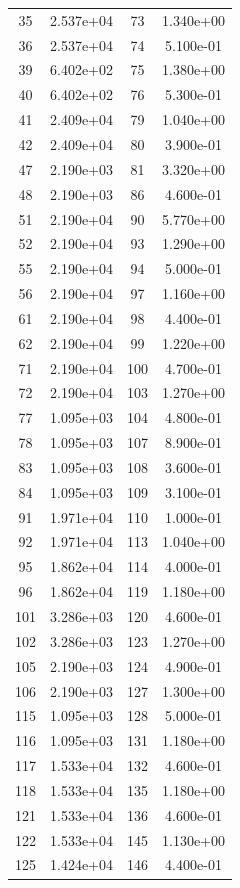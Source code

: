 \documentclass[12pt]{article}
\begin{document}
\begin{longtable}{@{}cccc@{}}
35 & 2.537e+04 & 73 & 1.340e+00 \\
36 & 2.537e+04 & 74 & 5.100e-01 \\
39 & 6.402e+02 & 75 & 1.380e+00 \\
40 & 6.402e+02 & 76 & 5.300e-01 \\
41 & 2.409e+04 & 79 & 1.040e+00 \\
42 & 2.409e+04 & 80 & 3.900e-01 \\
47 & 2.190e+03 & 81 & 3.320e+00 \\
48 & 2.190e+03 & 86 & 4.600e-01 \\
51 & 2.190e+04 & 90 & 5.770e+00 \\
52 & 2.190e+04 & 93 & 1.290e+00 \\
55 & 2.190e+04 & 94 & 5.000e-01 \\
56 & 2.190e+04 & 97 & 1.160e+00 \\
61 & 2.190e+04 & 98 & 4.400e-01 \\
62 & 2.190e+04 & 99 & 1.220e+00 \\
71 & 2.190e+04 & 100 & 4.700e-01 \\
72 & 2.190e+04 & 103 & 1.270e+00 \\
77 & 1.095e+03 & 104 & 4.800e-01 \\
78 & 1.095e+03 & 107 & 8.900e-01 \\
83 & 1.095e+03 & 108 & 3.600e-01 \\
84 & 1.095e+03 & 109 & 3.100e-01 \\
91 & 1.971e+04 & 110 & 1.000e-01 \\
92 & 1.971e+04 & 113 & 1.040e+00 \\
95 & 1.862e+04 & 114 & 4.000e-01 \\
96 & 1.862e+04 & 119 & 1.180e+00 \\
101 & 3.286e+03 & 120 & 4.600e-01 \\
102 & 3.286e+03 & 123 & 1.270e+00 \\
105 & 2.190e+03 & 124 & 4.900e-01 \\
106 & 2.190e+03 & 127 & 1.300e+00 \\
115 & 1.095e+03 & 128 & 5.000e-01 \\
116 & 1.095e+03 & 131 & 1.180e+00 \\
117 & 1.533e+04 & 132 & 4.600e-01 \\
118 & 1.533e+04 & 135 & 1.180e+00 \\
121 & 1.533e+04 & 136 & 4.600e-01 \\
122 & 1.533e+04 & 145 & 1.130e+00 \\
125 & 1.424e+04 & 146 & 4.400e-01 \\

\end{longtable}
\end{document}
